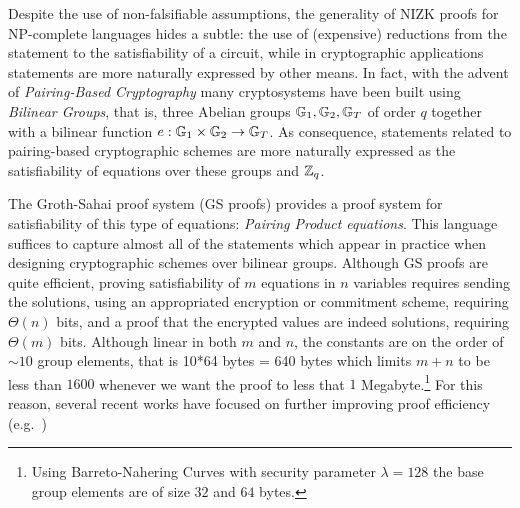 Despite the use of non-falsifiable assumptions, the generality of NIZK proofs for NP-complete languages hides a subtle: the use of (expensive) reductions
from the statement to the satisfiability of a circuit, while in cryptographic applications statements are more naturally expressed by other means.
In fact, with the advent of \emph{Pairing-Based Cryptography} many cryptosystems have been built using \emph{Bilinear Groups}, that is, three Abelian groups $\mathbb{G}_1,\mathbb{G}_2,\mathbb{G}_T$ of order $q$ together with a bilinear function $e:\mathbb{G}_1\times\mathbb{G}_2\to\mathbb{G}_T$. As consequence,
statements related to pairing-based cryptographic schemes are more naturally expressed as the satisfiability of equations over these groups and $\mathbb{Z}_q$.

The Groth-Sahai proof system (GS proofs) \cite{SIAMJC:GroSah12} 
  provides a proof system for satisfiability of this type of equations: \emph{Pairing Product equations}.
  This language suffices to capture almost all of the 
  statements which appear 
  in practice when designing cryptographic schemes over bilinear groups.  
Although GS proofs are quite efficient, proving satisfiability of $m$ equations in $n$ variables requires 
sending the solutions, using an appropriated encryption or commitment scheme, requiring $\Theta(n)$ bits, and a proof that the encrypted values are indeed solutions, requiring $\Theta(m)$ bits. Although linear in both $m$ and $n$, the constants are on the order of $\sim 10$ group elements, that is 10*64 bytes = 640 bytes which limits $m+n$ to be less than $1600$ whenever we want the proof to less that $1$ Megabyte.\footnote{Using Barreto-Nahering Curves with security parameter $\lambda=128$ the base group elements are of size $32$ and $64$ bytes.}  For this reason, several recent works 
 have focused on further improving proof efficiency 
 (e.g.\ \cite{PKC:EscGro14,C:EHKRV13,TCC:Rafols15})



